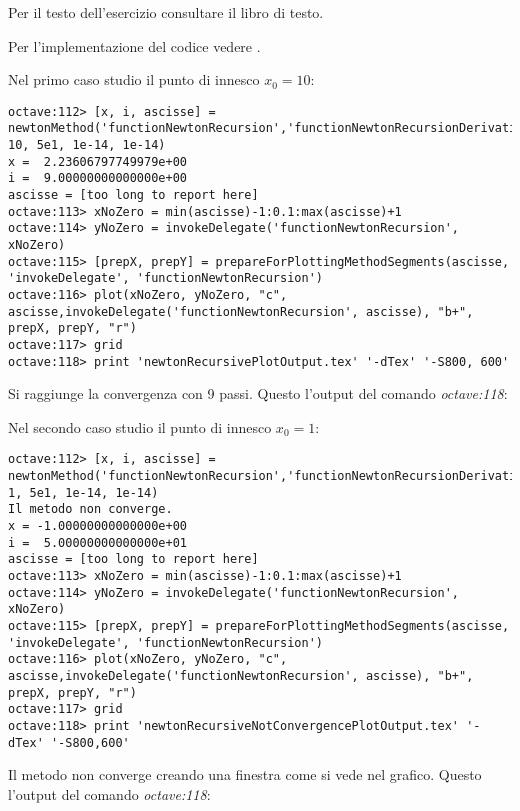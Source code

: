 \begin{exercise}[2.4]
Per il testo dell'esercizio consultare il libro di testo.
\end{exercise}
Per l'implementazione del codice vedere .

Nel primo caso studio il punto di innesco $x_{0} = 10$:
\begin{lstlisting}
octave:112> [x, i, ascisse] = newtonMethod('functionNewtonRecursion','functionNewtonRecursionDerivative', 10, 5e1, 1e-14, 1e-14)
x =  2.23606797749979e+00
i =  9.00000000000000e+00
ascisse = [too long to report here]
octave:113> xNoZero = min(ascisse)-1:0.1:max(ascisse)+1
octave:114> yNoZero = invokeDelegate('functionNewtonRecursion', xNoZero)
octave:115> [prepX, prepY] = prepareForPlottingMethodSegments(ascisse, 'invokeDelegate', 'functionNewtonRecursion')
octave:116> plot(xNoZero, yNoZero, "c", ascisse,invokeDelegate('functionNewtonRecursion', ascisse), "b+", prepX, prepY, "r")
octave:117> grid
octave:118> print 'newtonRecursivePlotOutput.tex' '-dTex' '-S800, 600'
\end{lstlisting}
Si raggiunge la convergenza con 9 passi. Questo l'output del comando
\emph{octave:118}:
\begin{center}

\end{center}

Nel secondo caso studio il punto di innesco $x_{0} = 1$:
\begin{lstlisting}
octave:112> [x, i, ascisse] = newtonMethod('functionNewtonRecursion','functionNewtonRecursionDerivative', 1, 5e1, 1e-14, 1e-14)
Il metodo non converge.
x = -1.00000000000000e+00
i =  5.00000000000000e+01
ascisse = [too long to report here]
octave:113> xNoZero = min(ascisse)-1:0.1:max(ascisse)+1
octave:114> yNoZero = invokeDelegate('functionNewtonRecursion', xNoZero)
octave:115> [prepX, prepY] = prepareForPlottingMethodSegments(ascisse, 'invokeDelegate', 'functionNewtonRecursion')
octave:116> plot(xNoZero, yNoZero, "c", ascisse,invokeDelegate('functionNewtonRecursion', ascisse), "b+", prepX, prepY, "r")
octave:117> grid
octave:118> print 'newtonRecursiveNotConvergencePlotOutput.tex' '-dTex' '-S800,600'
\end{lstlisting}
Il metodo non converge creando una finestra come si vede nel grafico. Questo
l'output del comando \emph{octave:118}:
\begin{center}

\end{center}